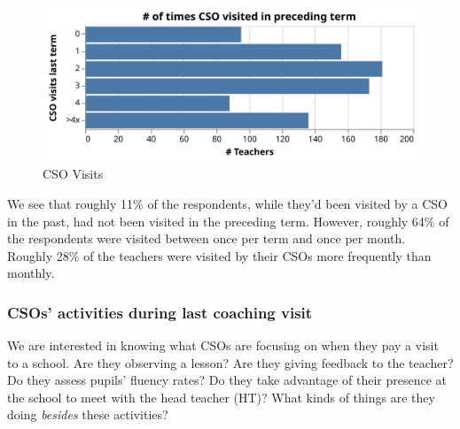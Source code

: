 \documentclass[11pt]{article}
\makeatletter
\def\maxwidth{\ifdim\Gin@nat@width>\linewidth\linewidth
    \else\Gin@nat@width\fi}
\let\Oldincludegraphics\includegraphics
\renewcommand{\includegraphics}[1]{\Oldincludegraphics[width=.8\maxwidth]{#1}}
\makeatother
\begin{document}
    \begin{figure}
\centering
\includegraphics{../img/csovisct_ch.svg}
\caption{CSO Visits}
\end{figure}

    We see that roughly 11\% of the respondents, while they'd been visited
by a CSO in the past, had not been visited in the preceding term.
However, roughly 64\% of the respondents were visited between once per
term and once per month. Roughly 28\% of the teachers were visited by
their CSOs more frequently than monthly.

    \hypertarget{csos-activities-during-last-coaching-visit}{%
\subsubsection{CSOs' activities during last coaching
visit}\label{csos-activities-during-last-coaching-visit}}

We are interested in knowing what CSOs are focusing on when they pay a
visit to a school. Are they observing a lesson? Are they giving feedback
to the teacher? Do they assess pupils' fluency rates? Do they take
advantage of their presence at the school to meet with the head teacher
(HT)? What kinds of things are they doing \emph{besides} these
activities?
\end{document}
